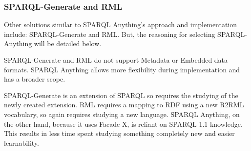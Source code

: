 \subsubsection{SPARQL-Generate and RML}
\hspace{0.5cm} Other solutions similar to SPARQL Anything's approach and implementation include: SPARQL-Generate and RML. But, the reasoning for selecting SPARQL-Anything will be detailed below.

SPARQL-Generate and RML do not support Metadata or Embedded data formats. \cite{sparqlanything} SPARQL Anything allows more flexibility during implementation and has a broader scope. 

SPARQL-Generate is an extension of SPARQL so requires the studying of the newly created extension. RML requires a mapping to RDF using a new R2RML vocabulary, so again requires studying a new language. SPARQL Anything, on the other hand, because it uses Facade-X, is reliant on SPARQL 1.1 knowledge. \cite{sparqlanything} This results in less time spent studying something completely new and easier learnability.